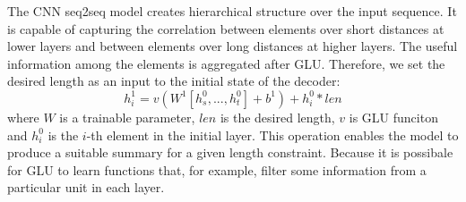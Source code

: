 
%
The CNN seq2seq model creates hierarchical
structure over the input sequence. It is capable of capturing the
correlation between elements over short distances at lower layers
and between elements over long distances at higher layers. 
The useful information among the elements is aggregated after GLU.
Therefore, we set the desired length as an input to the initial state of the decoder:
\begin{equation}
h^{1}_{i} \!=\! v(W^{1}[h^{0}_{s},...,h^{0}_{t}]\!+\!b^1)\!+\!h^{0}_{i}*len
\end{equation}
where $W$ is a trainable parameter, $len$ is the desired length, 
$v$ is GLU funciton and $h^{0}_{i}$ is the $i$-th element in the initial layer.
This operation enables the model to produce a suitable summary 
for a given length constraint. Because it is possibale for GLU to learn 
functions that, for example, filter some information
from a particular unit in each layer.

